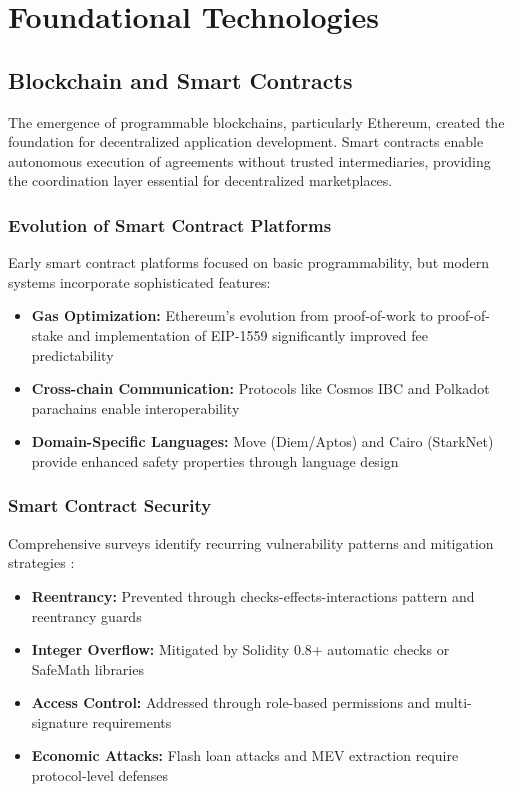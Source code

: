 \section{Foundational Technologies}

\subsection{Blockchain and Smart Contracts}

The emergence of programmable blockchains, particularly Ethereum, created the foundation for decentralized application development. Smart contracts enable autonomous execution of agreements without trusted intermediaries, providing the coordination layer essential for decentralized marketplaces.

\subsubsection{Evolution of Smart Contract Platforms}
Early smart contract platforms focused on basic programmability, but modern systems incorporate sophisticated features:
\begin{itemize}
    \item \textbf{Gas Optimization:} Ethereum's evolution from proof-of-work to proof-of-stake and implementation of EIP-1559 significantly improved fee predictability \citep{roughgarden2021eip1559}
    \item \textbf{Cross-chain Communication:} Protocols like Cosmos IBC and Polkadot parachains enable interoperability \citep{qasse2021inter}
    \item \textbf{Domain-Specific Languages:} Move (Diem/Aptos) and Cairo (StarkNet) provide enhanced safety properties through language design
\end{itemize}

\subsubsection{Smart Contract Security}
Comprehensive surveys identify recurring vulnerability patterns and mitigation strategies \citep{chen2020smartcontractsurvey}:
\begin{itemize}
    \item \textbf{Reentrancy:} Prevented through checks-effects-interactions pattern and reentrancy guards
    \item \textbf{Integer Overflow:} Mitigated by Solidity 0.8+ automatic checks or SafeMath libraries
    \item \textbf{Access Control:} Addressed through role-based permissions and multi-signature requirements
    \item \textbf{Economic Attacks:} Flash loan attacks and MEV extraction require protocol-level defenses
\end{itemize}

